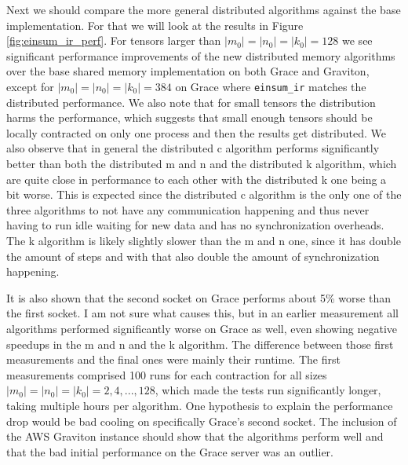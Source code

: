 Next we should compare the more general distributed algorithms against the base implementation.
For that we will look at the results in Figure \ref{fig:einsum_ir_perf}.
For tensors larger than $|m_0|=|n_0|=|k_0|=128$ we see significant performance improvements of the new distributed memory algorithms over the base shared memory implementation on both Grace and Graviton, except for $|m_0|=|n_0|=|k_0|=384$ on Grace where \texttt{einsum\_ir} matches the distributed performance.
We also note that for small tensors the distribution harms the performance, which suggests that small enough tensors should be locally contracted on only one process and then the results get distributed.
We also observe that in general the distributed c algorithm performs significantly better than both the distributed m and n and the distributed k algorithm, which are quite close in performance to each other with the distributed k one being a bit worse.
This is expected since the distributed c algorithm is the only one of the three algorithms to not have any communication happening and thus never having to run idle waiting for new data and has no synchronization overheads.
The k algorithm is likely slightly slower than the m and n one, since it has double the amount of steps and with that also double the amount of synchronization happening.

It is also shown that the second socket on Grace performs about 5\% worse than the first socket.
I am not sure what causes this, but in an earlier measurement all algorithms performed significantly worse on Grace as well, even showing negative speedups in the m and n and the k algorithm.
The difference between those first measurements and the final ones were mainly their runtime.
The first measurements comprised 100 runs for each contraction for all sizes $|m_0|=|n_0|=|k_0|=2,4,...,128$, which made the tests run significantly longer, taking multiple hours per algorithm.
One hypothesis to explain the performance drop would be bad cooling on specifically Grace's second socket.
The inclusion of the AWS Graviton instance should show that the algorithms perform well and that the bad initial performance on the Grace server was an outlier.



